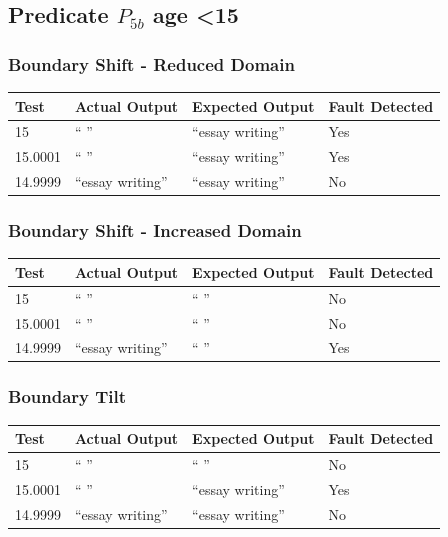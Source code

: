 \documentclass[11pt, oneside]{article}   	%
\begin{document}
\subsection{Predicate $P_{5b}$ age \textless 15}
\subsubsection{Boundary Shift - Reduced Domain}
\begin{table}[!htb]
\centering
\begin{tabular}{|l|l|l|l|}
\hline
Test    & Actual Output   & Expected Output & Fault Detected \\ \hline
15      & “ ”             & “essay writing” & Yes            \\ \hline
15.0001 & “ ”             & “essay writing” & Yes            \\ \hline
14.9999 & “essay writing” & “essay writing” & No             \\ \hline
\end{tabular}
\end{table}

\subsubsection{Boundary Shift - Increased Domain}
\begin{table}[!htb]
\centering
\begin{tabular}{|l|l|l|l|}
\hline
Test    & Actual Output   & Expected Output & Fault Detected \\ \hline
15      & “ ”             & “ ”             & No             \\ \hline
15.0001 & “ ”             & “ ”             & No             \\ \hline
14.9999 & “essay writing” & “ ”             & Yes            \\ \hline
\end{tabular}
\end{table}

\subsubsection{Boundary Tilt}
\begin{table}[!htb]
\centering
\begin{tabular}{|l|l|l|l|}
\hline
Test    & Actual Output   & Expected Output & Fault Detected \\ \hline
15      & “ ”             & “ ”             & No             \\ \hline
15.0001 & “ ”             & “essay writing” & Yes            \\ \hline
14.9999 & “essay writing” & “essay writing” & No             \\ \hline
\end{tabular}
\end{table}
\end{document}
